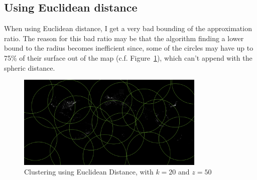 \documentclass{article}
\begin{document}
  \subsection{Using Euclidean distance}

    When using Euclidean distance, I get a very bad bounding of the
    approximation ratio. The reason for this bad ratio may be that the
    algorithm finding a lower bound to the radius becomes inefficient since,
    some of the circles may have up to 75\% of their surface out of the map
    (c.f.  Figure~\ref{map:euclidean}), which can't append with the spheric
    distance.

    \begin{figure}[h]
      \centering
      \includegraphics[width=0.8\textwidth,resolution=30]{euclidian_20-50}
      \caption{Clustering using Euclidean Distance, with $k = 20$ and $z = 50$}
      \label{map:euclidean}
    \end{figure}




\end{document}
